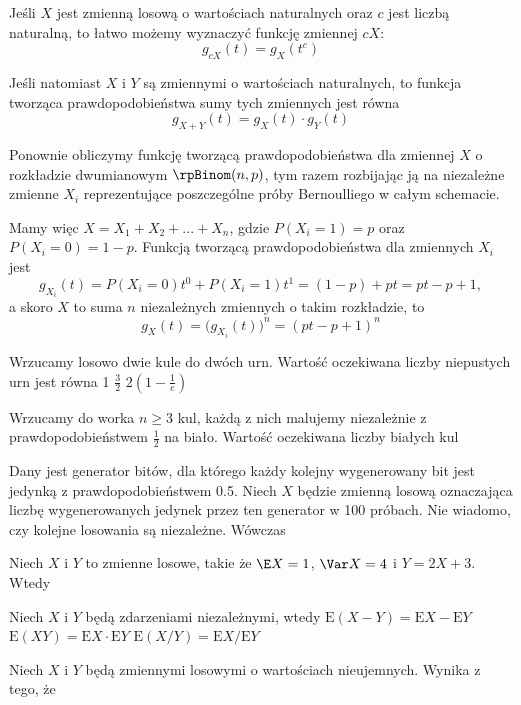 Jeśli $X$ jest zmienną losową o wartościach naturalnych oraz $c$ jest liczbą naturalną, to łatwo możemy wyznaczyć funkcję zmiennej $cX$:
$$g_{cX}(t) = g_X(t^c)$$

Jeśli natomiast $X$ i $Y$ są  zmiennymi o wartościach naturalnych, to funkcja tworząca prawdopodobieństwa sumy tych zmiennych jest równa
$$g_{X + Y}(t) = g_X(t) \cdot g_Y(t)$$

\begin{example}
    Ponownie obliczymy funkcję tworzącą prawdopodobieństwa dla zmiennej $X$ o rozkładzie dwumianowym $\rpBinom(n, p)$, tym razem rozbijając ją na niezależne zmienne $X_i$ reprezentujące poszczególne próby Bernoulliego w całym schemacie.

    Mamy więc $X = X_1 + X_2 + ... + X_n$, gdzie $P(X_i = 1) = p$ oraz $P(X_i = 0) = 1 - p$. Funkcją tworzącą prawdopodobieństwa dla zmiennych $X_i$ jest
    $$g_{X_i}(t) = P(X_i = 0) t^0 + P(X_i = 1) t^1 = (1 - p) + pt = pt - p + 1,$$
    a skoro $X$ to suma $n$ niezależnych zmiennych o takim rozkładzie, to
    $$g_X(t) = \big(g_{X_i}(t)\big)^n = (pt - p + 1)^n$$
\end{example}

\begin{problems}
    \prob Wrzucamy losowo dwie kule do dwóch urn. Wartość oczekiwana liczby niepustych urn jest równa
    \answers
    {1}
    {$\frac{3}{2}$}
    {$2(1 - \frac{1}{e})$}

    \prob Wrzucamy do worka $n \geq 3$ kul, każdą z nich malujemy niezależnie z prawdopodobieństwem $\frac{1}{2}$ na biało. Wartość oczekiwana liczby białych kul

    \prob Dany jest generator bitów, dla którego każdy kolejny wygenerowany bit jest jedynką z prawdopodobieństwem 0.5. Niech $X$ będzie zmienną losową oznaczająca liczbę wygenerowanych jedynek przez ten generator w 100 próbach. Nie wiadomo, czy kolejne losowania są niezależne. Wówczas

    \prob Niech $X$ i $Y$ to zmienne losowe, takie że $\E X = 1$, $\Var X = 4$ i $Y = 2X + 3$. Wtedy

    \prob Niech $X$ i $Y$ będą zdarzeniami niezależnymi, wtedy
    \answers
    {$\mathrm{E}(X - Y) = \mathrm{E}X - \mathrm{E}Y$}
    {$\mathrm{E}(XY) = \mathrm{E}X \cdot \mathrm{E}Y$}
    {$\mathrm{E}(X / Y) = \mathrm{E}X / \mathrm{E}Y$}

    \prob Niech $X$ i $Y$ będą zmiennymi losowymi o wartościach nieujemnych. Wynika z tego, że
\end{problems}

